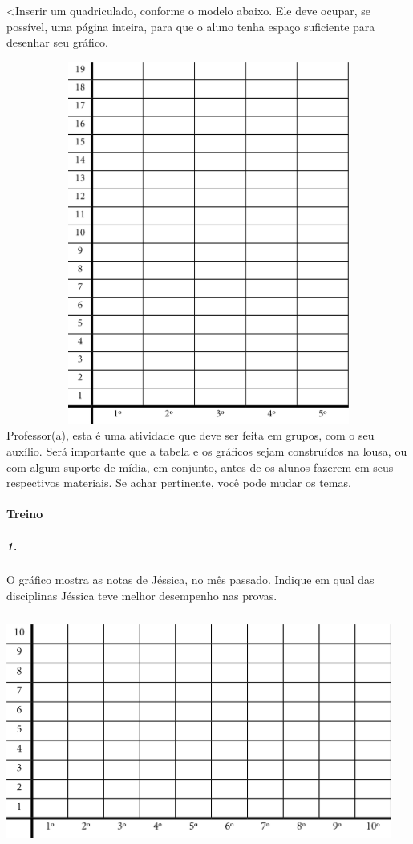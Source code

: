 \textless{}Inserir um quadriculado, conforme o modelo abaixo. Ele deve
ocupar, se possível, uma página inteira, para que o aluno tenha espaço
suficiente para desenhar seu gráfico.

\includegraphics[width=6.27778in,height=4.70833in]{media/image96.png}
Professor(a), esta é uma atividade que deve ser feita em grupos, com o
seu auxílio. Será importante que a tabela e os gráficos sejam
construídos na lousa, ou com algum suporte de mídia, em conjunto, antes
de os alunos fazerem em seus respectivos materiais. Se achar pertinente,
você pode mudar os temas. 

\paragraph{Treino}\label{treino-6}

\subparagraph{1.}\label{section-86}

O gráfico mostra as notas de Jéssica, no mês passado. Indique em
qual das disciplinas Jéssica teve melhor desempenho nas provas.

\includegraphics[width=5.00000in,height=3.01042in]{media/image97.png}

